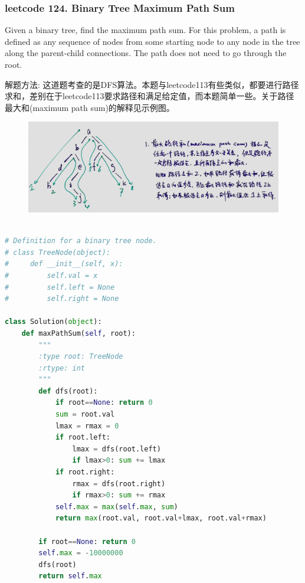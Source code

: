 \documentclass[a4paper,10pt]{article}
\begin{document}
\subsubsection{leetcode 124. Binary Tree Maximum Path Sum}
Given a binary tree, find the maximum path sum. For this problem, a path is defined as any sequence of nodes from some starting node to any node in the tree along the parent-child connections. The path does not need to go through the root. \\

\begin{CJK*}{UTF8}{gbsn}
\noindent 解题方法: 这道题考查的是DFS算法。本题与leetcode113有些类似，都要进行路径求和，差别在于leetcode113要求路径和满足给定值，而本题简单一些。关于路径最大和(maximum path sum)的解释见示例图。
\end{CJK*}

\begin{figure}[h]
    \includegraphics[width=1\textwidth]{leetcode124.jpg}
    \centering\\
\end{figure}

\begin{lstlisting}[language=Python, caption=Problem124. Binary Tree Maximum Path Sum]

# Definition for a binary tree node.
# class TreeNode(object):
#     def __init__(self, x):
#         self.val = x
#         self.left = None
#         self.right = None

class Solution(object):
    def maxPathSum(self, root):
        """
        :type root: TreeNode
        :rtype: int
        """
        def dfs(root):
            if root==None: return 0
            sum = root.val
            lmax = rmax = 0
            if root.left:
                lmax = dfs(root.left)
                if lmax>0: sum += lmax
            if root.right:
                rmax = dfs(root.right)
                if rmax>0: sum += rmax
            self.max = max(self.max, sum)
            return max(root.val, root.val+lmax, root.val+rmax)
        
        if root==None: return 0
        self.max = -10000000
        dfs(root)
        return self.max
\end{lstlisting}
\end{document}

